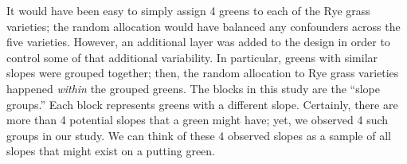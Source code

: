 \documentclass[
  letterpaper,
  DIV=11,
  numbers=noendperiod]{scrreprt}
\theoremstyle{plain}
\theoremstyle{definition}
\theoremstyle{definition}
\theoremstyle{remark}
\begin{document}
\begin{table}

\caption{\label{tbl-anovadata-golf-table}Data from the Overseeding Golf
Greens example.}


\end{table}%

It would have been easy to simply assign 4 greens to each of the Rye
grass varieties; the random allocation would have balanced any
confounders across the five varieties. However, an additional layer was
added to the design in order to control some of that additional
variability. In particular, greens with similar slopes were grouped
together; then, the random allocation to Rye grass varieties happened
\emph{within} the grouped greens. The blocks in this study are the
``slope groups.'' Each block represents greens with a different slope.
Certainly, there are more than 4 potential slopes that a green might
have; yet, we observed 4 such groups in our study. We can think of these
4 observed slopes as a sample of all slopes that might exist on a
putting green.
\end{document}
